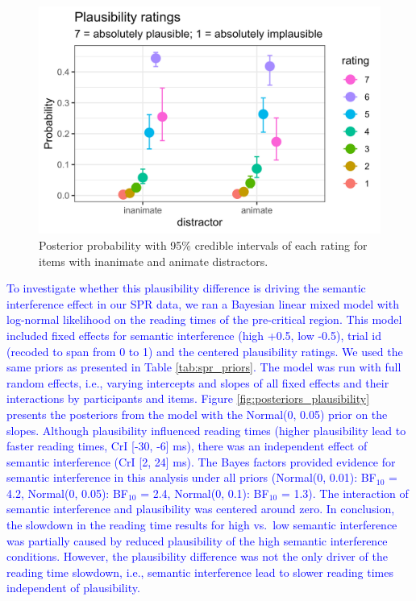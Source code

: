 \documentclass[a4paper, man, floatsintext]{apa7}
\begin{document}
{\begin{figure}[htpb]
    \centering
        \caption{Posterior probability with 95\% credible intervals of each rating for items with inanimate and animate distractors.}
    \label{fig:plausibility_anim_inanim}
    \includegraphics[width=0.8\linewidth]{images/plausibility_anim_inan.jpg}
\end{figure}

\textcolor{blue}{To investigate whether this plausibility difference is driving the semantic interference effect in our SPR data, we ran a Bayesian linear mixed model with log-normal likelihood on the reading times of the pre-critical region. This model included fixed effects for semantic interference (high +0.5, low -0.5), trial id (recoded to span from 0 to 1) and the centered plausibility ratings. We used the same priors as presented in Table \ref{tab:spr_priors}. The model was run with full random effects, i.e., varying intercepts and slopes of all fixed effects and their interactions by participants and items. Figure \ref{fig:posteriors_plausibility} presents the posteriors from the model with the Normal(0, 0.05) prior on the slopes. Although plausibility influenced reading times (higher plausibility lead to faster reading times, CrI [-30, -6] ms), there was an independent effect of semantic interference (CrI [2, 24] ms). The Bayes factors provided evidence for semantic interference in this analysis under all priors (Normal(0, 0.01): BF$_{10}$ = 4.2,
Normal(0, 0.05): BF$_{10}$ = 2.4,
Normal(0, 0.1): BF$_{10}$ = 1.3). The interaction of semantic interference and plausibility was centered around zero. In conclusion, the slowdown in the reading time results for high vs.\ low semantic interference was partially caused by reduced plausibility of the high semantic interference conditions. However, the plausibility difference was not the only driver of the reading time slowdown, i.e., semantic interference lead to slower reading times independent of plausibility.}

}
\end{document}
